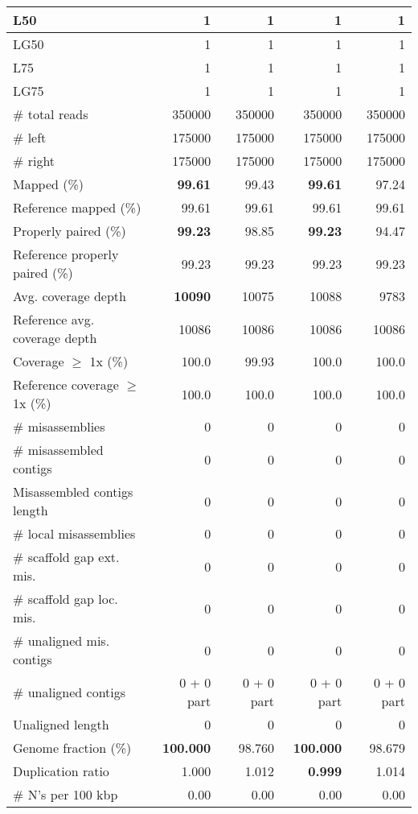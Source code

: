 \documentclass[12pt,a4paper]{article}
\begin{document}
\begin{table}[ht]
\begin{center}
\begin{tabular}{|l*{4}{|r}|}
L50 & 1 & 1 & 1 & 1 \\ \hline
LG50 & 1 & 1 & 1 & 1 \\ \hline
L75 & 1 & 1 & 1 & 1 \\ \hline
LG75 & 1 & 1 & 1 & 1 \\ \hline
\# total reads & 350000 & 350000 & 350000 & 350000 \\ \hline
\# left & 175000 & 175000 & 175000 & 175000 \\ \hline
\# right & 175000 & 175000 & 175000 & 175000 \\ \hline
Mapped (\%) & {\bf 99.61} & 99.43 & {\bf 99.61} & 97.24 \\ \hline
Reference mapped (\%) & 99.61 & 99.61 & 99.61 & 99.61 \\ \hline
Properly paired (\%) & {\bf 99.23} & 98.85 & {\bf 99.23} & 94.47 \\ \hline
Reference properly paired (\%) & 99.23 & 99.23 & 99.23 & 99.23 \\ \hline
Avg. coverage depth & {\bf 10090} & 10075 & 10088 & 9783 \\ \hline
Reference avg. coverage depth & 10086 & 10086 & 10086 & 10086 \\ \hline
Coverage $\geq$ 1x (\%) & 100.0 & 99.93 & 100.0 & 100.0 \\ \hline
Reference coverage $\geq$ 1x (\%) & 100.0 & 100.0 & 100.0 & 100.0 \\ \hline
\# misassemblies & 0 & 0 & 0 & 0 \\ \hline
\# misassembled contigs & 0 & 0 & 0 & 0 \\ \hline
Misassembled contigs length & 0 & 0 & 0 & 0 \\ \hline
\# local misassemblies & 0 & 0 & 0 & 0 \\ \hline
\# scaffold gap ext. mis. & 0 & 0 & 0 & 0 \\ \hline
\# scaffold gap loc. mis. & 0 & 0 & 0 & 0 \\ \hline
\# unaligned mis. contigs & 0 & 0 & 0 & 0 \\ \hline
\# unaligned contigs & 0 + 0 part & 0 + 0 part & 0 + 0 part & 0 + 0 part \\ \hline
Unaligned length & 0 & 0 & 0 & 0 \\ \hline
Genome fraction (\%) & {\bf 100.000} & 98.760 & {\bf 100.000} & 98.679 \\ \hline
Duplication ratio & 1.000 & 1.012 & {\bf 0.999} & 1.014 \\ \hline
\# N's per 100 kbp & 0.00 & 0.00 & 0.00 & 0.00 \\ \hline

\end{tabular}
\end{center}
\end{table}
\end{document}

